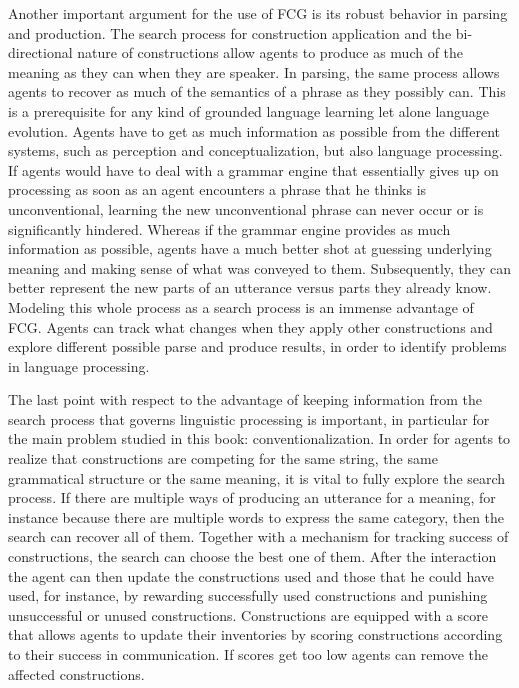 Another important argument for the use of FCG is its robust
behavior in parsing and production. The search process
for construction application and the bi-directional 
nature of constructions allow agents to produce
as much of the meaning as they can when they
are speaker. In parsing, the same process
allows agents to  recover as much of the semantics 
of a phrase as they possibly can. This is a prerequisite 
for any kind of grounded language learning let alone
language evolution. Agents have to get as much
information as possible from the different systems,
such as perception and conceptualization, but also
language processing. If agents would have to deal with
a grammar engine that essentially gives up on processing
as soon as an agent encounters a phrase that he
thinks is unconventional, learning the new unconventional
phrase can never occur or is significantly hindered. Whereas
if the grammar engine provides as much information as 
possible, agents have a much better shot at guessing
underlying meaning and making sense
of what was conveyed to them. Subsequently,
they can better represent the new parts of an 
utterance versus parts they already know.
Modeling this whole process as a search
process is an immense advantage of FCG.
Agents can track what changes when they
apply other constructions and explore different
possible parse and produce results, in order
to identify problems in language processing.

The last point with respect to the advantage of
keeping information from the search process that
governs linguistic processing is important, in particular
for the main problem studied in this book: conventionalization.
In order for agents to realize that constructions are competing
for the same string, the same grammatical structure or
the same meaning, it is vital to fully explore the search process.
If there are multiple ways of producing an utterance for a meaning,
for instance because there are multiple words to express
the same category, then the search can recover 
all of them. Together with a mechanism for tracking
success of constructions, the search can choose
the best one of them. After the interaction the agent can
then update the constructions used and those that
he could have used, for instance, by rewarding
successfully used constructions and punishing 
unsuccessful or unused constructions.
Constructions are equipped with a score that
allows agents to update their inventories
by scoring constructions according to their success
in communication. If scores get too low agents can remove
the affected constructions.

